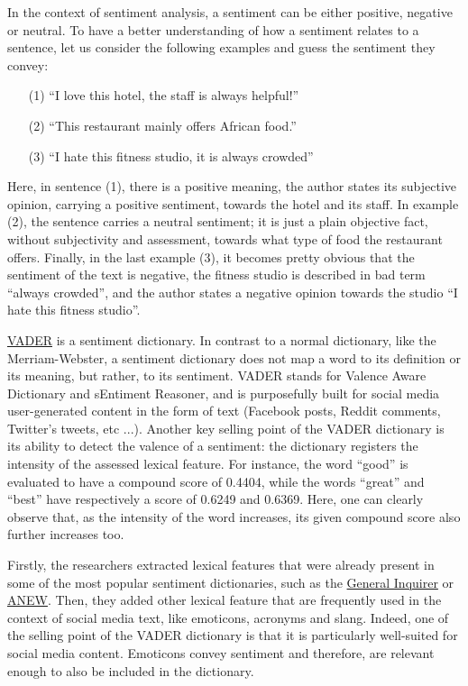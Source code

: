 	In the context of sentiment analysis, a sentiment can be either positive, negative or neutral. To have a better understanding of how a sentiment relates to a sentence, let us consider the following examples and guess the sentiment they convey:
	\begin{enumerate}
	\item[(1)] ``I love this hotel, the staff is always helpful!''
	\item[(2)] ``This restaurant mainly offers African food.''
	\item[(3)] ``I hate this fitness studio, it is always crowded''
	\end{enumerate}

	Here, in sentence (1), there is a positive meaning, the author states its subjective opinion, carrying a positive sentiment, towards the hotel and its staff. In example (2), the sentence carries a neutral sentiment; it is just a plain objective fact, without subjectivity and assessment, towards what type of food the restaurant offers. Finally, in the last example (3), it becomes pretty obvious that the sentiment of the text is negative, the fitness studio is described in bad term ``always crowded'', and the author states a negative opinion towards the studio ``I hate this fitness studio''.
	
	\href{https://github.com/cjhutto/vaderSentiment}{VADER} is a sentiment dictionary. In contrast to a normal dictionary, like the Merriam-Webster, a sentiment dictionary does not map a word to its definition or its meaning, but rather, to its sentiment.
	VADER stands for Valence Aware Dictionary and sEntiment Reasoner, and is purposefully built for social media user-generated content in the form of text (Facebook posts, Reddit comments, Twitter's tweets, etc ...). Another key selling point of the VADER dictionary is its ability to detect the valence of a sentiment: the dictionary registers the intensity of the assessed lexical feature. For instance, the word ``good'' is evaluated to have a compound score of 0.4404, while the words ``great'' and ``best'' have respectively a score of 0.6249 and 0.6369. Here, one can clearly observe that, as the intensity of the word increases, its given compound score also further increases too.\newline
	
	Firstly, the researchers extracted lexical features that were already present in some of the most popular sentiment dictionaries, such as the \href{https://wjh.harvard.edu/~inquirer/}{General Inquirer} or \href{https://csea.phhp.ufl.edu/media.html#bottommedia}{ANEW}. Then, they added other lexical feature that are frequently used in the context of social media text, like emoticons, acronyms and slang. Indeed, one of the selling point of the VADER dictionary is that it is particularly well-suited for social media content. Emoticons convey sentiment and therefore, are relevant enough to also be included in the dictionary.
	
